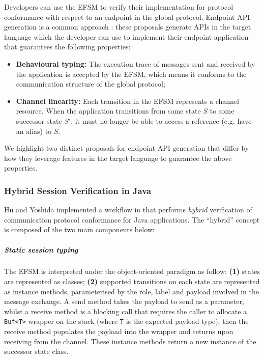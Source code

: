 Developers can use the EFSM to verify their implementation
for protocol conformance with respect to an endpoint
in the global protocol.
Endpoint API generation is a common approach
\cite{HuJava,Hybrid2016,Python2017,PureScript2019,LinearDecomp}:
these proposals generate APIs in the target language
which the developer
can use to implement their endpoint application that guarantees
the following properties:

\begin{itemize}

\item \textbf{Behavioural typing:}
The execution trace of messages sent and received by
the application is accepted by the EFSM, which means it
conforms to the communication structure of the global protocol;

\item \textbf{Channel linearity:}
Each transition in the EFSM represents a channel resource.
When the application transitions from some state $S$
to some successor state $S'$, it must no longer
be able to access a reference (e.g. have an alias) to $S$.
\end{itemize}

We highlight two distinct proposals for endpoint
API generation that differ
by how they leverage features in the target language
to guarantee the above properties.

\subsubsection{Hybrid Session Verification in Java}
Hu and Yoshida implemented a workflow in \cite{Hybrid2016}
that performs \textit{hybrid} verification of 
communication protocol conformance for Java applications.
The ``hybrid'' concept is composed of the two main components below:

\subparagraph{Static session typing}
The EFSM is interpreted under the object-oriented paradigm as follow:
\textbf{(1)} states are represented as classes;
\textbf{(2)} supported transitions on each state are 
represented as instance methods,
parameterised by the role, label and payload involved 
in the message exchange. 
A send method takes the payload to send as a parameter,
whilst a receive method is a blocking call that 
requires the caller to allocate a \texttt{Buf<T>} wrapper 
on the stack (where \texttt{T} is the expected payload type),
then the receive method populates the payload into 
the wrapper and returns upon receiving from the channel. 
These instance methods return a new instance of 
the successor state class.

